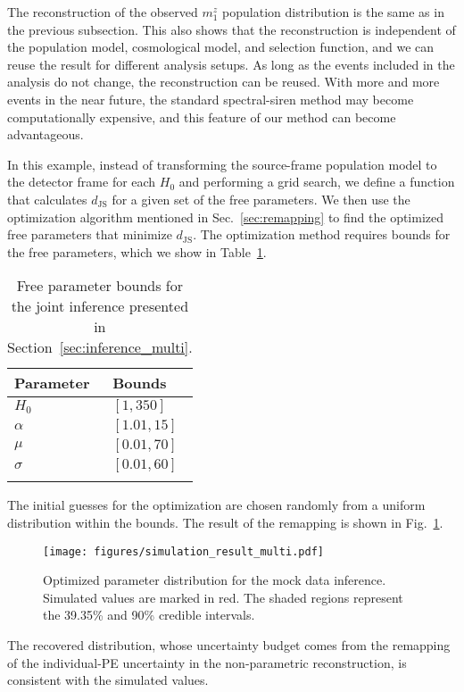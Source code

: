 \documentclass[sn-aps, pdflatex, iicol]{sn-jnl}
\begin{document}
The reconstruction of the observed $m^z_1$ population distribution is the same as in the previous subsection.
This also shows that the reconstruction is independent of the population model, cosmological model, and selection function, and we can reuse the result for different analysis setups.
As long as the events included in the analysis do not change, the reconstruction can be reused.
With more and more events in the near future, the standard spectral-siren method may become computationally expensive, and this feature of our method can become advantageous.

In this example, instead of transforming the source-frame population model to the detector frame for each $H_0$ and performing a grid search, we define a function that calculates $d_\mathrm{JS}$ for a given set of the free parameters.
We then use the optimization algorithm mentioned in Sec.~\ref{sec:remapping} to find the optimized free parameters that minimize $d_\mathrm{JS}$.
The optimization method requires bounds for the free parameters, which we show in Table~\ref{tab:bounds}.
\begin{table}
    \caption{Free parameter bounds for the joint inference presented in Section~\ref{sec:inference_multi}.}
    \begin{tabularx}{\linewidth}{>{\centering\arraybackslash}X >{\centering\arraybackslash}X}
        \toprule
        Parameter & Bounds \\
        \midrule
        $H_0$ & $[1, 350]$ \\
        $\alpha$ & $[1.01, 15]$ \\
        $\mu$ & $[0.01, 70]$ \\
        $\sigma$ & $[0.01, 60]$ \\
        \botrule
    \end{tabularx}
    \label{tab:bounds}
\end{table}
The initial guesses for the optimization are chosen randomly from a uniform distribution within the bounds.
The result of the remapping is shown in Fig.~\ref{fig:simulation_result_multi}.
\begin{figure}
    \texttt{[image: figures/simulation\_result\_multi.pdf]}
    \caption{
        Optimized parameter distribution for the mock data inference.
        Simulated values are marked in red.
        The shaded regions represent the 39.35\% and 90\% credible intervals.
    }
    \label{fig:simulation_result_multi}
\end{figure}
The recovered distribution, whose uncertainty budget comes from the remapping of the individual-\ac{PE} uncertainty in the non-parametric reconstruction, is consistent with the simulated values.
\end{document}
